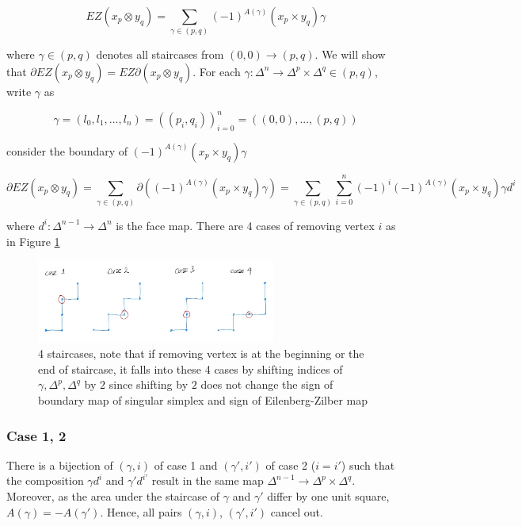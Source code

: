 \documentclass{article}
\begin{document}
$$
    EZ(x_p \otimes y_q) = \sum_{\gamma \in (p, q)} (-1)^{A(\gamma)} (x_p \times y_q) \gamma
$$

where $\gamma \in (p, q)$ denotes all staircases from $(0, 0) \to (p, q)$. We will show that $\partial EZ(x_p \otimes y_q) = EZ \partial (x_p \otimes y_q)$. For each $\gamma: \Delta^n \to \Delta^p \times \Delta^q \in (p, q)$, write $\gamma$ as

$$
    \gamma = (l_0, l_1, ..., l_n) = ((p_i, q_i))_{i=0}^n = ((0, 0), ..., (p, q))
$$

consider the boundary of $(-1)^{A(\gamma)} (x_p \times y_q) \gamma$

$$
    \partial EZ(x_p \otimes y_q) = \sum_{\gamma \in (p, q)} \partial ((-1)^{A(\gamma)} (x_p \times y_q) \gamma) = \sum_{\gamma \in (p, q)} \sum_{i=0}^n (-1)^i (-1)^{A(\gamma)} (x_p \times y_q) \gamma d^i
$$

where $d^i: \Delta^{n-1} \to \Delta^n$ is the face map. There are 4 cases of removing vertex $i$ as in Figure \ref{fig_staircase}

\begin{figure}[h]
\centering
\includegraphics[width=0.7\textwidth]{staircase.jpg}
\caption{4 staircases, note that if removing vertex is at the beginning or the end of staircase, it falls into these 4 cases by shifting indices of $\gamma, \Delta^p, \Delta^q$ by $2$ since shifting by $2$ does not change the sign of boundary map of singular simplex and sign of Eilenberg-Zilber map}
\label{fig_staircase}
\end{figure}

\subsubsection{Case 1, 2}

There is a bijection of $(\gamma, i)$ of case 1 and $(\gamma', i')$ of case 2 ($i = i'$) such that the composition $\gamma d^i$ and $\gamma' d^{i'}$ result in the same map $\Delta^{n-1} \to \Delta^p \times \Delta^q$. Moreover, as the area under the staircase of $\gamma$ and $\gamma'$ differ by one unit square, $A(\gamma) = - A(\gamma')$. Hence, all pairs $(\gamma, i)$, $(\gamma', i')$ cancel out.
\end{document}
